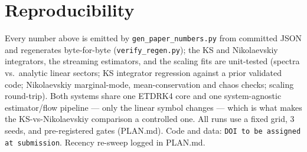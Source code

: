 \documentclass[11pt]{article}
\begin{document}
\section{Reproducibility}
Every number above is emitted by \texttt{gen\_paper\_numbers.py} from committed
JSON and regenerates byte-for-byte (\texttt{verify\_regen.py}); the KS and
Nikolaevskiy integrators, the streaming estimators, and the scaling fits are
unit-tested (spectra vs.\ analytic linear sectors; KS integrator regression
against a prior validated code; Nikolaevskiy marginal-mode, mean-conservation and
chaos checks; scaling round-trip). Both systems share one ETDRK4 core and one
system-agnostic estimator/flow pipeline --- only the linear symbol changes ---
which is what makes the KS-vs-Nikolaevskiy comparison a controlled one. All runs
use a fixed grid, $3$ seeds, and pre-registered gates (PLAN.md). Code and data:
\texttt{DOI to be assigned at submission}. Recency re-sweep logged in PLAN.md.

\small


\end{document}
